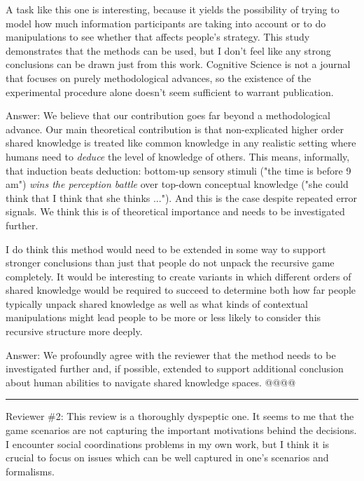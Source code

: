 \documentclass{article}
\newenvironment{robin}{\smallskip \noindent \color{red!10!green!50!blue}}{\color{black}\smallskip}
\begin{document}
A task like this one is interesting, because it yields the possibility of trying to model how much information participants are taking into account or to do manipulations to see whether that affects people's strategy. This study demonstrates that the methods can be used, but I don't feel like any strong conclusions can be drawn just from this work. Cognitive Science is not a journal that focuses on purely methodological advances, so the existence of the experimental procedure alone doesn't seem sufficient to warrant publication.

\begin{robin} Answer: We believe that our contribution goes far beyond a methodological advance. Our main theoretical contribution is that non-explicated higher order shared knowledge is treated like common knowledge in any realistic setting where humans need to \emph{deduce} the level of knowledge of others. This means, informally, that induction beats deduction: bottom-up sensory stimuli ("the time is before 9 am") \emph{wins the perception battle} over top-down conceptual knowledge ("she could think that I think that she thinks ..."). And this is the case despite repeated error signals. We think this is of theoretical importance and needs to be investigated further.
\end{robin}

I do think this method would need to be extended in some way to support stronger conclusions than just that people do not unpack the recursive game completely. It would be interesting to create variants in which different orders of shared knowledge would be required to succeed to determine both how far people typically unpack shared knowledge as well as what kinds of contextual manipulations might lead people to be more or less likely to consider this recursive structure more deeply.

\begin{robin} Answer: We profoundly agree with the reviewer that the method needs to be investigated further and, if possible, extended to support additional conclusion about human abilities to navigate shared knowledge spaces. @@@@
\end{robin}

\medskip
 \hrule
\medskip

Reviewer \#2:
This review is a thoroughly dyspeptic one. It seems to me that the game scenarios are not capturing the important motivations behind the decisions. I encounter social coordinations problems in my own work, but I think it is crucial to focus on issues which can be well captured in one's scenarios and formalisms.
\end{document}

